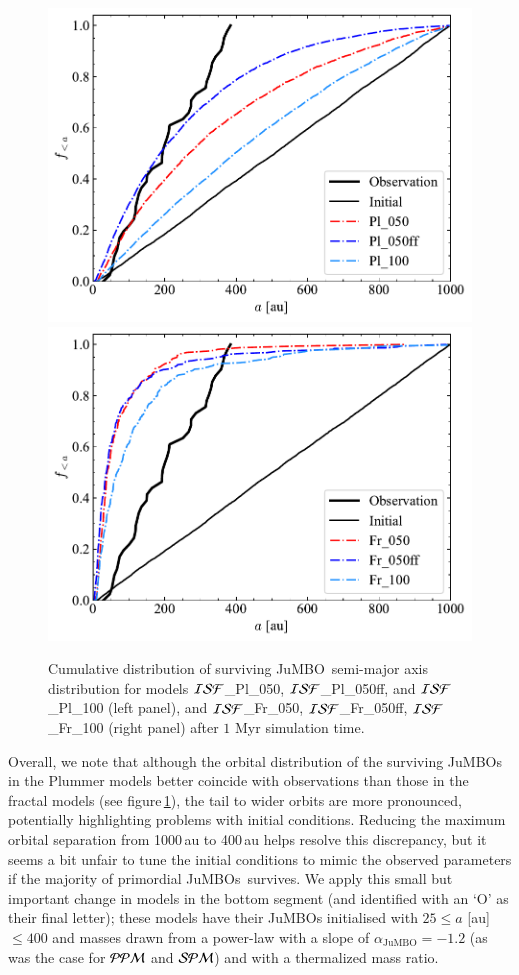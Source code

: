 \documentclass[submission,phys]{lib/SciPost}
\newcommand{\jumbo}{\mbox{JuMBO}}
\newcommand{\jumbos}{\mbox{JuMBOs}}
\begin{document}
\begin{figure}
    \centering
    \includegraphics[width=0.49\columnwidth]{figures/Plummer_General_sem_axis.pdf}
    \includegraphics[width=0.49\columnwidth]{figures/Fractal_General_sem_axis.pdf}
    \caption{Cumulative distribution of surviving \jumbo\, semi-major
      axis distribution for models ${\cal ISF}$\_Pl\_050, ${\cal ISF}$\_Pl\_050ff, and ${\cal ISF}$\_Pl\_100
      (left panel), and ${\cal ISF}$\_Fr\_050, ${\cal ISF}$\_Fr\_050ff, ${\cal ISF}$\_Fr\_100 (right panel) after $1$ Myr simulation time.}
    \label{Fig:Gen_Semi_Plummer}
    \label{Fig:Gen_Semi_Fractal}
\end{figure}

Overall, we note that although the orbital distribution of the
surviving \jumbos\, in the Plummer models better coincide with
observations than those in the fractal models (see
figure\,\ref{Fig:Gen_Semi_Fractal}), the tail to wider orbits are more
pronounced, potentially highlighting problems with initial conditions.
Reducing the maximum orbital separation from 1000\,au to 400\,au helps
resolve this discrepancy, but it seems a bit unfair to tune the
initial conditions to mimic the observed parameters if the majority of
primordial \jumbos\ survives.  We apply this small but important
change in models in the bottom segment (and identified with an `O' as
their final letter); these models have their JuMBOs initialised with
$25\leq a$ [au]$\leq 400$ and masses drawn from a power-law with a
slope of $\alpha_{\jumbo} =-1.2$ (as was the case for ${\cal PPM}$ and
${\cal SPM}$) and with a thermalized mass ratio.  
\end{document}

